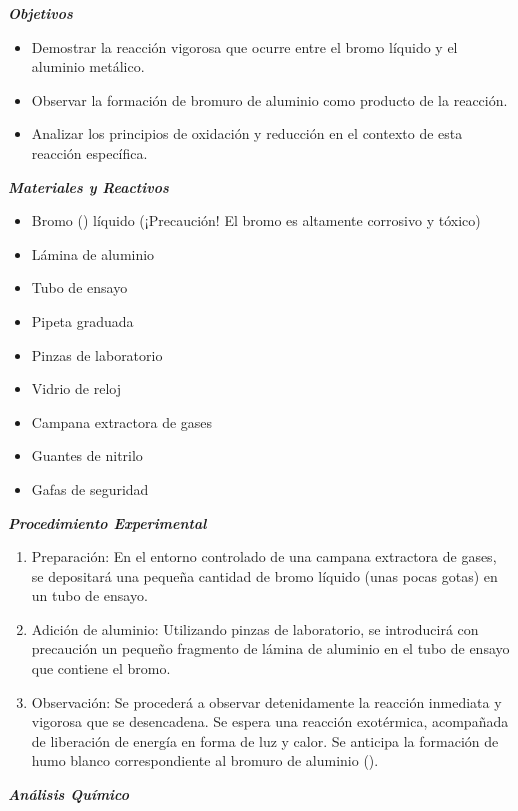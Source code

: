     \textit{\textbf{Objetivos }} 
    \begin{itemize}
        \item Demostrar la reacción vigorosa que ocurre entre el bromo líquido y el aluminio metálico.  
    
        \item Observar la formación de bromuro de aluminio como producto de la reacción.  
        
        \item Analizar los principios de oxidación y reducción en el contexto de esta reacción específica. 
    \end{itemize}
    \textit{\textbf{Materiales y Reactivos}}  
    \begin{itemize}
        \item Bromo () líquido (¡Precaución! El bromo es altamente corrosivo y tóxico)  
    
        \item Lámina de aluminio  
        
        \item Tubo de ensayo  
        
        \item Pipeta graduada  
        
        \item Pinzas de laboratorio  
        
        \item Vidrio de reloj  
        
        \item Campana extractora de gases  
        
        \item Guantes de nitrilo  
        
        \item Gafas de seguridad  
    \end{itemize}
    \textit{\textbf{Procedimiento Experimental }} 
    \begin{enumerate}
        \item Preparación: En el entorno controlado de una campana extractora de gases, se depositará una pequeña cantidad de bromo líquido (unas pocas gotas) en un tubo de ensayo.  
        
        \item Adición de aluminio: Utilizando pinzas de laboratorio, se introducirá con precaución un pequeño fragmento de lámina de aluminio en el tubo de ensayo que contiene el bromo.  
        
        \item Observación: Se procederá a observar detenidamente la reacción inmediata y vigorosa que se desencadena. Se espera una reacción exotérmica, acompañada de liberación de energía en forma de luz y calor. Se anticipa la formación de humo blanco correspondiente al bromuro de aluminio (). 
    \end{enumerate}
    \newpage
    \textit{\textbf{Análisis Químico}}  
    
